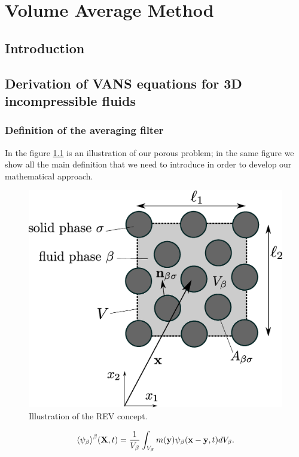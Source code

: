 \chapter{Volume Average Method}
\label{ch:vans}

\section{Introduction}


\section{Derivation of VANS equations for 3D incompressible fluids}
\subsection{Definition of the averaging filter}

In the figure \ref{fig:rev} is an illustration of our porous problem; in the same figure we show all the main definition that we need to introduce in order to develop our mathematical approach.


\begin{figure}[H]
	\centering
	\includegraphics[width=0.8\linewidth]{chapter_4/figure/REV}
	\caption{Illustration of the REV concept.}
	\label{fig:rev}
\end{figure}


\begin{equation}
{\left< \psi_{\beta} \right>}^{\beta}(\mathbf{X}, t) = \dfrac{1}{V_\beta} \int_{V_\beta} m(\mathbf{y}) \psi_{\beta}(\mathbf{x}-\mathbf{y}, t) d V_\beta.
\label{eq:avg_intrinsic}
\end{equation}


